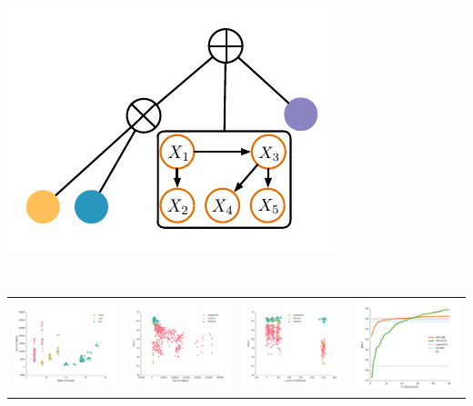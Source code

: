 \documentclass[xcolor={usenames,dvipsnames,svgnames}, compress]{beamer}
\begin{document}
\begin{frame}
\begin{minipage}[t]{2.43cm}
  \end{minipage}\hspace{3pt}\begin{minipage}[t]{2.43cm}
      \includegraphics[width=\linewidth]{figures/spn-clt}                                             
  \end{minipage}\\[-25pt]
  \begin{table}[ht]
    \setlength{\tabcolsep}{3pt}  
    \centering
    \begin{tabular}[t]{c c c c}
      \includegraphics[width=0.23\linewidth]{figures/plants-depth.pdf}&\includegraphics[width=0.23\linewidth]{figures/ll-depth/10-8/pumsb-star-ll-depth}&\includegraphics[width=0.23\linewidth]{figures/ll-m/10-8/pumsb-star-ll-m}&\includegraphics[width=0.23\linewidth]{figures/curves/dna-png.pdf}\\
    \end{tabular}
  \end{table}      
\end{frame}
\end{document}
